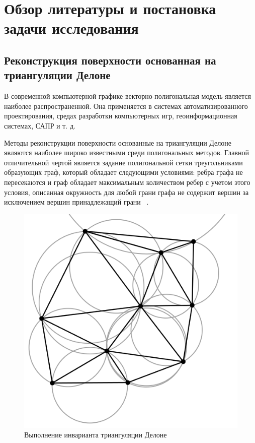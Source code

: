 \section{Обзор литературы и постановка задачи исследования}
\subsection{Реконструкция поверхности основанная на триангуляции Делоне}
В современной компьютерной графике векторно-полигональная модель является наиболее распространенной. Она применяется в системах автоматизированного проектирования, средах разработки компьютерных игр, геоинформационная системах, САПР и т. д.

Методы реконструкции поверхности основанные на триангуляции Делоне являются наиболее широко известными среди полигональных методов. Главной отличительной чертой является задание полигональной сетки треугольниками образующих граф, который обладает следующими условиями: ребра графа не пересекаются и граф обладает максимальным количеством ребер с учетом этого условия, описанная окружность для любой грани графа не содержит вершин за исключением вершин принадлежащий грани ~\cite{Скворцов}. 

\begin{figure}[h]
    \centering
    \includegraphics[scale=0.7]{images/delaunay.png}
    \caption{Выполнение инварианта триангуляции Делоне}
    \label{fig:delauney}
\end{figure}

